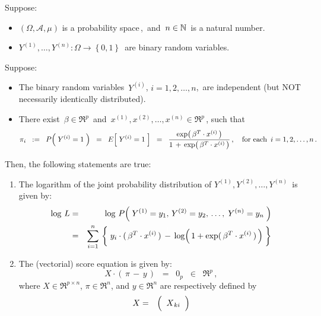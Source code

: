 \begin{proposition}
\mbox{}\vskip 0.1cm\noindent
Suppose:
\begin{itemize}
\item
	$\left(\Omega,\mathcal{A},\mu\right)$ is a probability space\,,
	\,and
	\,$n \in \mathbb{N}$\, is a natural number.
\item
	$Y^{(1)}, \ldots, Y^{(n)} : \Omega \longrightarrow \left\{0,1\right\}$\,
	are binary random variables.
\end{itemize}
Suppose:
\begin{itemize}
\item
	The binary random variables \,$Y^{(i)}$, $i = 1, 2, \ldots, n$,\,
	are independent (but NOT necessarily identically distributed).
\item
	There exist
	\,$\beta \in \Re^{p}$\,
	and
	\,$x^{(1)}, x^{(2)}, \ldots, x^{(n)} \in \Re^{p}$\,,
	such that
	\begin{equation*}
	\pi_{i}
	\;\; := \;\;
		P\!\left(\; Y^{(i)} = 1 \;\right)
	\;\; = \;\;
		E\!\left[\; Y^{(i)}  = 1 \;\right]
	\;\; = \;\;
		\dfrac{
			\exp\!\left(\,\beta^{T} \cdot x^{(i)} \,\right)
			}{
			1 \,+\, \exp\!\left(\,\beta^{T} \cdot x^{(i)} \,\right)
			}\,,
	\quad
	\textnormal{for each \,$i = 1,2,\ldots,n$}\,.
	\end{equation*}
\end{itemize}
Then, the following statements are true:
\begin{enumerate}
\item
	The logarithm of the joint probability distribution of
	\;$Y^{(1)},Y^{(2)},\ldots,Y^{(n)}$\, is given by:
	\begin{eqnarray*}
	\log\,L
		&=&
		\log\,P\!\left(\; Y^{(1)}=y_{1},\,Y^{(2)}=y_{2},\,\ldots,\;Y^{(n)}=y_{n} \;\right)
	\\
	&=&
		\overset{n}{\underset{i=1}{\sum}}\,
		\left\{\;
			y_{i}\cdot(\,\beta^{T} \cdot x^{(i)}\,)
			\, \overset{{\color{white}\vert}}{-} \,
			\log\!\left(\,1 + \exp(\,\beta^{T} \cdot x^{(i)}\,)\,\right)
			\;\right\}
	\end{eqnarray*}
\item
	The (vectorial) score equation is given by:
	\begin{equation*}
	X \cdot \left(\, \pi \,-\, y\,\right) \;\; = \;\; 0_{p} \;\; \in \;\; \Re^{p}\,,
	\end{equation*}
	where $X \in \Re^{p \times n}$, $\pi \in \Re^{n}$, and $y \in \Re^{n}$ are respectively defined by
	\begin{eqnarray*}
	X
	&=&
		\left(\;\;\overset{{\color{white}.}}{X}_{ki}\;\;\right)

\end{eqnarray*}
\end{enumerate}
\end{proposition}
